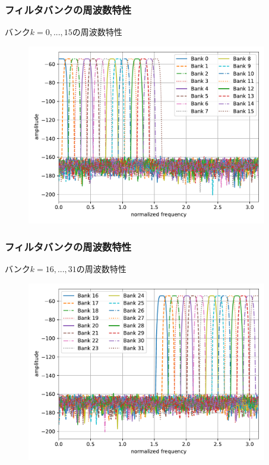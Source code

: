\documentclass[14pt,xcolor=dvipsnames,table,dvipdfmx]{beamer}
\begin{document}
\begin{frame}[c]
    \frametitle{フィルタバンクの周波数特性}
    バンク$k = 0, ..., 15$の周波数特性
    \vspace{-5pt}
    \begin{figure}
        \includegraphics[width=105mm]{./figs/mp3_encoder_filter_bank_frequency_spec_0_15.pdf}
    \end{figure}
\end{frame}

\begin{frame}[c]
    \frametitle{フィルタバンクの周波数特性}
    バンク$k = 16, ..., 31$の周波数特性
    \vspace{-5pt}
    \begin{figure}
        \includegraphics[width=105mm]{./figs/mp3_encoder_filter_bank_frequency_spec_16_31.pdf}
    \end{figure}
\end{frame}
\end{document}
